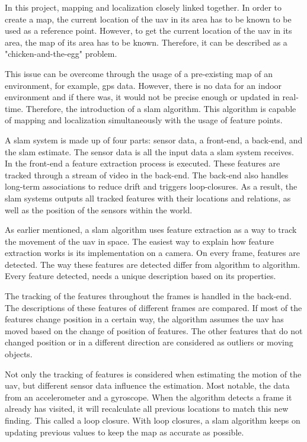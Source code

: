 In this project, mapping and localization closely linked together. In order to create a map, the current location of the \acs{uav} in its area has to be known to be used as a reference point. However, to get the current location of the \acs{uav} in its area, the map of its area has to be known. Therefore, it can be described as a "chicken\hyp{}and\hyp{}the\hyp{}egg" problem.

This issue can be overcome through the usage of a pre-existing map of an environment, for example, \acs{gps} data. However, there is no data for an indoor environment and if there was, it would not be precise enough or updated in real\hyp{}time. Therefore, the introduction of a \acs{slam} algorithm. This algorithm is capable of mapping and localization simultaneously with the usage of feature points.

A \acs{slam} system is made up of four parts: sensor data, a front\hyp{}end, a back\hyp{}end, and the \acs{slam} estimate. The sensor data is all the input data a \acs{slam} system receives. In the front\hyp{}end a feature extraction process is executed. These features are tracked through a stream of video in the back\hyp{}end. The back\hyp{}end also handles long\hyp{}term associations to reduce drift and triggers loop\hyp{}closures. As a result, the \acs{slam} systems outputs all tracked features with their locations and relations, as well as the position of the sensors within the world.

As earlier mentioned, a \acs{slam} algorithm uses feature extraction as a way to track the movement of the \acs{uav} in space. The easiest way to explain how feature extraction works is its implementation on a camera. On every frame, features are detected. The way these features are detected differ from algorithm to algorithm. Every feature detected, needs a unique description based on its properties. 

The tracking of the features throughout the frames is handled in the back\hyp{}end. The descriptions of these features of different frames are compared. If most of the features change position in a certain way, the algorithm assumes the \acs{uav} has moved based on the change of position of features. The other features that do not changed position or in a different direction are considered as outliers or moving objects.

Not only the tracking of features is considered when estimating the motion of the \acs{uav}, but different sensor data influence the estimation. Most notable, the data from an accelerometer and a gyroscope. When the algorithm detects a frame it already has visited, it will recalculate all previous locations to match this new finding. This called a loop closure. With loop closures, a \acs{slam} algorithm keeps on updating previous values to keep the map as accurate as possible.
